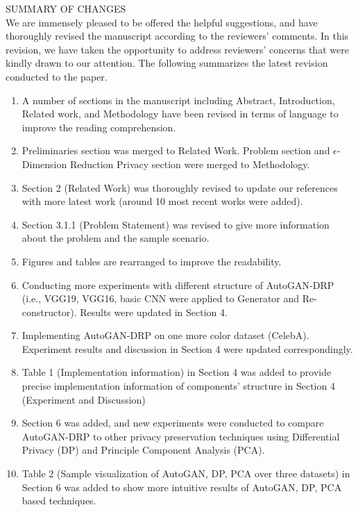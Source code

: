 \documentclass[]{elsarticle}
\begin{document}
\newcommand{\argmin}[1]{\underset{#1}{\operatorname{arg}\,\operatorname{min}}\;}
\newcommand{\minmax}[1]{\underset{#1}{\operatorname{min}\,\operatorname{max}}\;}
\newcommand{\prob}[2]{p_#1(#2)}


SUMMARY OF CHANGES
\\


We are immensely pleased to be offered the helpful suggestions, and have thoroughly revised the manuscript according to the reviewers’ comments. In this revision, we have taken the opportunity to address reviewers’ concerns that were kindly drawn to our attention. The following summarizes the latest revision conducted to the paper.

\begin{enumerate}
	\item A number of sections in the manuscript including Abstract, Introduction, Related work, and Methodology have been revised in terms of language to improve the reading comprehension. 
	 
	\item Preliminaries section was merged to Related Work. Problem section and $\epsilon$-Dimension Reduction Privacy section were merged to Methodology. 
	
	\item Section 2 (Related Work) was thoroughly revised to update our references with more latest work (around 10 most recent works were added).
		
	\item Section 3.1.1 (Problem Statement) was revised to give more information about the problem and the sample scenario. 
	
	\item  Figures and tables are rearranged to improve the readability.
	   
	\item Conducting more experiments with different structure of AutoGAN-DRP (i.e., VGG19, VGG16, basic CNN were applied to Generator and Re-constructor). Results were updated in Section 4.  
	
	\item Implementing AutoGAN-DRP on one more color dataset (CelebA). Experiment results and discussion in Section 4 were updated correspondingly. 
	
	\item Table 1 (Implementation information) in Section 4 was added to provide precise implementation information of components' structure in Section 4 (Experiment and Discussion)  
	
	\item Section 6 was added, and new experiments were conducted to compare AutoGAN-DRP to other privacy preservation techniques using Differential Privacy (DP) and Principle Component Analysis (PCA). 
	
	\item Table 2 (Sample visualization of AutoGAN, DP, PCA over three datasets) in Section 6 was added to show more intuitive results of AutoGAN, DP, PCA based techniques.   
\end{enumerate}
\end{document}
